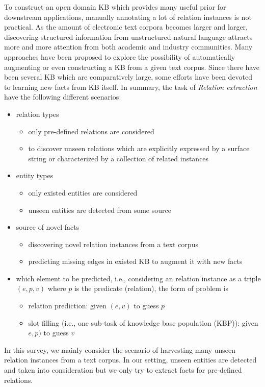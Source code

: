 \documentclass[10pt]{article} %
\theoremstyle{definition}
\theoremstyle{definition}
\begin{document}
To construct an open domain KB which provides many useful prior for downstream applications, manually annotating a lot of relation instances is not practical. 
As the amount of electronic text corpora becomes larger and larger, discovering structured information from unstructured natural language attracts more and more attention from both academic and industry communities.
Many approaches have been proposed to explore the possibility of automatically augmenting or even constructing a KB from a given text corpus. 
Since there have been several KB which are comparatively large, some efforts have been devoted to learning new facts from KB itself. 
In summary, the task of \emph{Relation extraction} have the following different scenarios:
\begin{itemize}
\item relation types 
	\begin{itemize}
	\item only pre-defined relations are considered 
	\item to discover unseen relations which are explicitly expressed by a surface string or characterized by a collection of related instances 
	\end{itemize}
\item entity types 
	\begin{itemize}
	\item only existed entities are considered 
	\item unseen entities are detected from some source 
	\end{itemize}
\item source of novel facts 
	\begin{itemize}
	\item discovering novel relation instances from a text corpus 
	\item predicting missing edges in existed KB to augment it with new facts 
	\end{itemize}
\item which element to be predicted, i.e., considering an relation instance as a triple $(e,p,v)$ where $p$ is the predicate (relation), the form of problem is 
	\begin{itemize}
	\item relation prediction: given $(e, v)$ to guess $p$
	\item slot filling (i.e., one sub-task of knowledge base population (KBP)): given $e, p)$ to guess $v$
	\end{itemize}
\end{itemize}
In this survey, we mainly consider the scenario of harvesting many unseen relation instances from a text corpus. 
In our setting, unseen entities are detected and taken into consideration but we only try to extract facts for pre-defined relations. 
\end{document}
